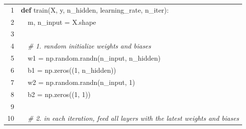 \documentclass[preprint,12pt]{elsarticle}
\begin{document}
\begin{table}[ht]
    \centering
    {\ttfamily\scriptsize
        \begin{tabular}{|r l l l l|}
            \hline
            \rowcolor{regularback} \cellcolor{linenumberback} \textcolor{grayhighlight}{1} & \multicolumn{4}{l|}{\textcolor{codegreen}{\textbf{def}} \textcolor{navykeyword}{train}(X, y, n\_hidden, learning\_rate, n\_iter):} \\
            \rowcolor{regularback} \cellcolor{linenumberback} \textcolor{grayhighlight}{2} & & \multicolumn{3}{l|}{m, n\_input \textcolor{grayhighlight}{=} X\textcolor{grayhighlight}{.}shape} \\
            \rowcolor{regularback} \cellcolor{linenumberback} \textcolor{grayhighlight}{3} & \multicolumn{4}{l|}{} \\
            \rowcolor{regularback} \cellcolor{linenumberback} \textcolor{grayhighlight}{4} & & \multicolumn{3}{l|}{\textcolor{commentblue}{\textit{\# 1. random initialize weights and biases}}} \\
            \rowcolor{regularback} \cellcolor{linenumberback} \textcolor{grayhighlight}{5} & & \multicolumn{3}{l|}{w1 \textcolor{grayhighlight}{=} np\textcolor{grayhighlight}{.}random\textcolor{grayhighlight}{.}randn(n\_input, n\_hidden)} \\
            \rowcolor{regularback} \cellcolor{linenumberback} \textcolor{grayhighlight}{6} & & \multicolumn{3}{l|}{b1 \textcolor{grayhighlight}{=} np\textcolor{grayhighlight}{.}zeros((\textcolor{grayhighlight}{1}, n\_hidden))} \\
            \rowcolor{regularback} \cellcolor{linenumberback} \textcolor{grayhighlight}{7} & & \multicolumn{3}{l|}{w2 \textcolor{grayhighlight}{=} np\textcolor{grayhighlight}{.}random\textcolor{grayhighlight}{.}randn(n\_input, \textcolor{grayhighlight}{1})} \\
            \rowcolor{regularback} \cellcolor{linenumberback} \textcolor{grayhighlight}{8} & & \multicolumn{3}{l|}{b2 \textcolor{grayhighlight}{=} np\textcolor{grayhighlight}{.}zeros((\textcolor{grayhighlight}{1}, \textcolor{grayhighlight}{1}))} \\
            \rowcolor{regularback} \cellcolor{linenumberback} \textcolor{grayhighlight}{9} & \multicolumn{4}{l|}{} \\
            \rowcolor{regularback} \cellcolor{linenumberback} \textcolor{grayhighlight}{10} & & \multicolumn{3}{l|}{\textcolor{commentblue}{\textit{\# 2. in each iteration, feed all layers with the latest weights and biases}}} \\

\end{tabular}}
\end{table}
\end{document}
